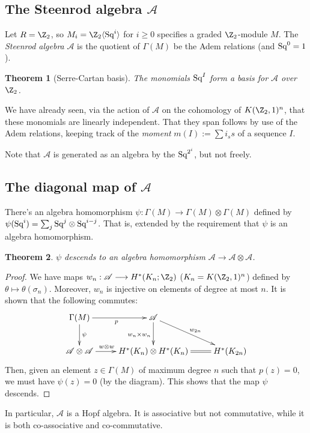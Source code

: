 \documentclass[11pt]{article}
\newcommand{\Squ}{\textup{Sq}}
\theoremstyle{plain}
\newtheorem*{thm*}{Theorem}
\theoremstyle{definition}
\renewcommand{\to}{\longrightarrow}
\renewcommand{\mapsto}{\longmapsto}
\newcommand{\Steen}{\mathscr{A}}
\begin{document}
\subsection{The Steenrod algebra \texorpdfstring{$\Steen$}{A}}
Let $R=\Z_2$, so $M_i=\Z_2\langle\Squ^i\rangle$ for $i\geq0$ specifies a graded $\Z_2$-module $M$. The \emph{Steenrod algebra} $\Steen$ is the quotient of $\Gamma(M)$ be the Adem relations (and $\Squ^0=1$).
\begin{thm*}[Serre-Cartan basis]
The monomials $\Squ^I$ form a basis for $\Steen$ over $\Z_2$.
\end{thm*}
We have already seen, via the action of $\Steen$ on the cohomology of $K(\Z_2,1)^n$, that these monomials are linearly independent. That they span follows by use of the Adem relations, keeping track of the \emph{moment} $m(I):=\sum i_ss$ of a sequence $I$.

Note that $\Steen$ is generated as an algebra by the $\Squ^{2^i}$, but not freely.
\setcounter{subsection}{3}
\subsection{The diagonal map of \texorpdfstring{$\Steen$}{A}}
There's an algebra homomorphism $\psi:\Gamma(M)\to\Gamma(M)\otimes\Gamma(M)$ defined by $\psi(\Squ^i)=\sum_j \Squ^j\otimes\Squ^{i-j}$. That is, extended by the requirement that $\psi$ is an algebra homomorphism.
\begin{thm*}
$\psi$ descends to an algebra homomorphism $\Steen\to\Steen\otimes\Steen$.
\end{thm*}
\begin{proof}
We have maps $w_n:\Steen\to H^*(K_n;\Z_2)$ ($K_n=K(\Z_2,1)^n$) defined by $\theta\mapsto\theta(\sigma_n)$. Moreover, $w_n$ is injective on elements of degree at most $n$. It is shown  that the following commutes:
\[\xymatrix{
\Gamma(M)\ar[r]_p\ar[d]^\psi&\Steen\ar[d]_{w_n\times w_n}\ar[rd]^{w_{2n}}\\
\Steen\otimes\Steen\ar[r]^{w\otimes w\qquad \ }&H^*(K_n)\otimes H^*(K_n)\ar@{=}[r]&H^*(K_{2n})
}\]
Then, given an element $z\in\Gamma(M)$ of maximum degree $n$ such that $p(z)=0$, we must have $\psi(z)=0$ (by the diagram). This shows that the map $\psi$ descends.%
\end{proof}
In particular, $\Steen$ is a Hopf algebra. It is associative but not commutative, while it is both co-associative and co-commutative.
\end{document}
